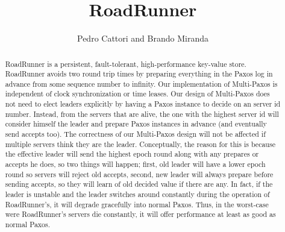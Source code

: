 \documentclass[a4paper]{article}
\title{RoadRunner}
\author{Pedro Cattori and Brando Miranda}
\begin{document}
\maketitle

\begin{abstract}
RoadRunner is a persistent, fault-tolerant, high-performance key-value store. 
RoadRunner avoids two round trip times by preparing everything in the Paxos log in advance from some sequence number to infinity. 
Our implementation of Multi-Paxos is independent of clock synchronization or time leases.
Our design of Multi-Paxos does not need to elect leaders explicitly by having a Paxos instance to decide on an server id number.
Instead, from the servers that are alive, the one with the highest server id will consider himself the leader and prepare Paxos instances in advance (and eventually send accepts too).
The correctness of our Multi-Paxos design will not be affected if multiple servers think they are the leader. 
Conceptually, the reason for this is because the effective leader will send the highest epoch round along with any prepares or accepts he does, so two things will happen; first, old leader will have a lower epoch round so servers will reject old accepts, second, new leader will always prepare before sending accepts, so they will learn of old decided value if there are any. 
In fact, if the leader is unstable and the leader switches around constantly during the operation of RoadRunner's, it will degrade gracefully into normal Paxos. 
Thus, in the worst-case were RoadRunner's servers die constantly, it will offer performance at least as good as normal Paxos.
\end{abstract}
\end{document}
